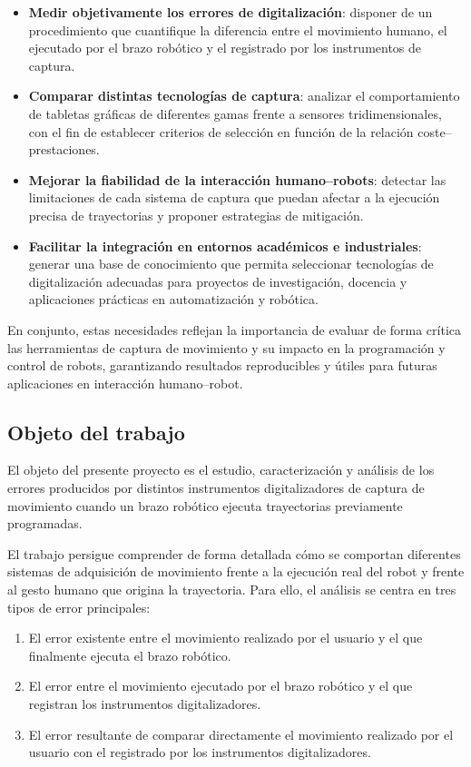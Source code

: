 \documentclass[12pt,a4paper,oneside]{report}
\begin{document}
\begin{itemize}
    \item \textbf{Medir objetivamente los errores de digitalización}: disponer
    de un procedimiento que cuantifique la diferencia entre el movimiento
    humano, el ejecutado por el brazo robótico y el registrado por los
    instrumentos de captura.

    \item \textbf{Comparar distintas tecnologías de captura}: analizar el
    comportamiento de tabletas gráficas de diferentes gamas frente a sensores
    tridimensionales, con el fin de establecer criterios de selección en
    función de la relación coste–prestaciones.

    \item \textbf{Mejorar la fiabilidad de la interacción humano–\glspl{robot}}:
    detectar las limitaciones de cada sistema de captura que puedan afectar a
    la ejecución precisa de trayectorias y proponer estrategias de mitigación.

    \item \textbf{Facilitar la integración en entornos académicos e
    industriales}: generar una base de conocimiento que permita seleccionar
    tecnologías de digitalización adecuadas para proyectos de investigación,
    docencia y aplicaciones prácticas en automatización y robótica.

\end{itemize}

En conjunto, estas necesidades reflejan la importancia de evaluar de forma
crítica las herramientas de captura de movimiento y su impacto en la
programación y control de \glspl{robot}, garantizando resultados reproducibles y
útiles para futuras aplicaciones en interacción humano–robot.

\subsection{Objeto del trabajo}

El objeto del presente proyecto es el estudio, caracterización y análisis de los errores producidos por distintos instrumentos digitalizadores de captura de movimiento cuando un brazo robótico ejecuta trayectorias previamente programadas.

El trabajo persigue comprender de forma detallada cómo se comportan diferentes sistemas de adquisición de movimiento frente a la ejecución real del \gls{robot} y frente al gesto humano que origina la trayectoria. Para ello, el análisis se centra en tres tipos de error principales:
\begin{enumerate}
	\item El error existente entre el movimiento realizado por el usuario y el que finalmente ejecuta el brazo robótico.
	\item El error entre el movimiento ejecutado por el brazo robótico y el que registran los instrumentos digitalizadores.
	\item El error resultante de comparar directamente el movimiento realizado por el usuario con el registrado por los instrumentos digitalizadores.
\end{enumerate}
\end{document}
